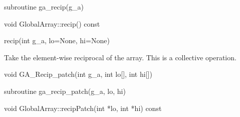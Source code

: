 \documentclass[12pt]{article}
\begin{document}
\begin{fapi}
\begin{fcode}
subroutine ga_recip(g_a)
\end{fcode}
\begin{funcargs}
\end{funcargs}
\end{fapi}

\begin{cxxapi}
\begin{cxxcode}
void GlobalArray::recip() const
\end{cxxcode}
\end{cxxapi}

\begin{pyapi}
\begin{pycode}
recip(int g_a, lo=None, hi=None) 
\end{pycode}
\end{pyapi}

\begin{desc}

Take the element-wise reciprocal of the array.
This is a collective operation.
\end{desc}


\begin{capi}
\begin{ccode}
void GA_Recip_patch(int g_a, int lo[], int hi[])
\end{ccode}
\begin{funcargs}
\end{funcargs}
\end{capi}

\begin{fapi}
\begin{fcode}
subroutine ga_recip_patch(g_a, lo, hi)
\end{fcode}
\begin{funcargs}
\end{funcargs}
\end{fapi}

\begin{cxxapi}
\begin{cxxcode}
void GlobalArray::recipPatch(int *lo, int *hi) const
\end{cxxcode}
\begin{funcargs}
\end{funcargs}
\end{cxxapi}
\end{document}
